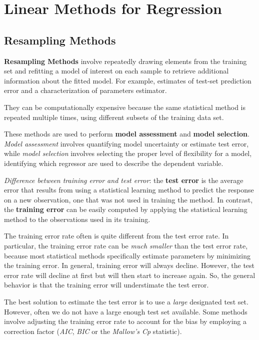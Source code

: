 \chapter{Linear Methods for Regression}
\section{Resampling Methods}
\textbf{Resampling Methods} involve repeatedly drawing elements from the training set and refitting a model of interest on each sample to retrieve additional information about the fitted model. For example, estimates of test-set prediction error and a characterization of parameters estimator.

They can be computationally expensive because the same statistical method is repeated multiple times, using different subsets of the training data set.

These methods are used to perform \textbf{model assessment} and \textbf{model selection}. \textit{Model assessment} involves quantifying model uncertainty or estimate test error, while \textit{model selection} involves selecting the proper level of flexibility for a model, identifying which regressor are used to describe the dependent variable.

\textit{Difference between training error and test error}: the \textbf{test error} is the average error that results from using a statistical learning method to predict the response on a new observation, one that was not used in training the method.
In contrast, the \textbf{training error} can be easily computed by applying the statistical learning method to the observations used in its training.

The training error rate often is quite different from the test error rate. In particular, the training error rate can be \textit{much smaller} than the test error rate, because most statistical methods specifically estimate parameters by minimizing the training error.
In general, training error will always decline. However, the test error rate will decline at first but will then start to increase again. So, the general behavior is that the training error will understimate the test error.

The best solution to estimate the test error is to use a \textit{large} designated test set. However, often we do not have a large enough test set available. Some methods involve adjusting the training error rate to account for the bias by employing a correction factor (\textit{AIC}, \textit{BIC} or the \textit{Mallow's Cp} statistic).


